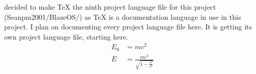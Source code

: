 \documentclass{article} %
\title{\ProjectLanguageFileNine} %
\begin{document}
  \maketitle
  \I decided to make TeX the ninth project language file for this project (Seanpm2001/BlazeOS/) as TeX is a documentation language in use in this project. I plan on documenting every project language file here. It is getting its own project language file, starting here.
  \begin{align}
    E_0 &= mc^2 \\
    E &= \frac{mc^2}{\sqrt{1-\frac{v^2}{c^2}}}
  \end{align} 
\end{document}
